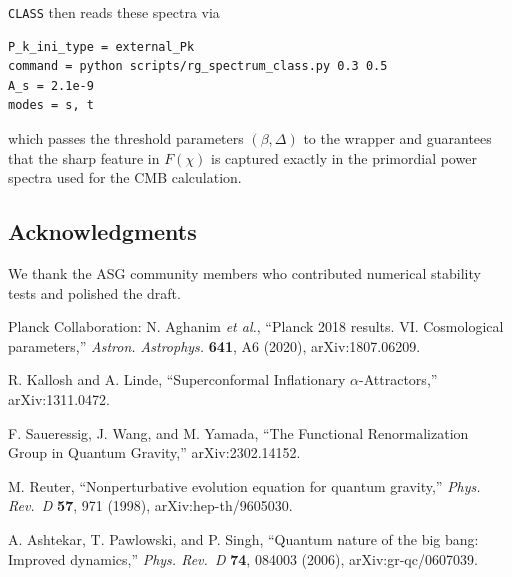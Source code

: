 \documentclass[
]{article}
\begin{document}
\texttt{CLASS} then reads these spectra via

\begin{verbatim}
P_k_ini_type = external_Pk
command = python scripts/rg_spectrum_class.py 0.3 0.5
A_s = 2.1e-9
modes = s, t
\end{verbatim}

which passes the threshold parameters \((\beta, \Delta)\) to the wrapper
and guarantees that the sharp feature in \(F(\chi)\) is captured exactly
in the primordial power spectra used for the CMB calculation.

\subsection{Acknowledgments}\label{acknowledgments}

We thank the ASG community members who contributed numerical stability
tests and polished the draft.

Planck Collaboration: N. Aghanim \emph{et al.}, ``Planck 2018 results.
VI. Cosmological parameters,'' \emph{Astron. Astrophys.} \textbf{641},
A6 (2020), arXiv:1807.06209.

R. Kallosh and A. Linde, ``Superconformal Inflationary
\(\alpha\)-Attractors,'' arXiv:1311.0472.

F. Saueressig, J. Wang, and M. Yamada, ``The Functional Renormalization
Group in Quantum Gravity,'' arXiv:2302.14152.

M. Reuter, ``Nonperturbative evolution equation for quantum gravity,''
\emph{Phys. Rev.~D} \textbf{57}, 971 (1998), arXiv:hep-th/9605030.

A. Ashtekar, T. Pawlowski, and P. Singh, ``Quantum nature of the big
bang: Improved dynamics,'' \emph{Phys. Rev.~D} \textbf{74}, 084003
(2006), arXiv:gr-qc/0607039.
\end{document}

